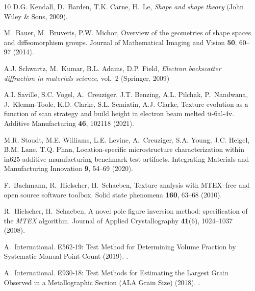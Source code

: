 \documentclass[pdflatex,iicol]{sn-jnl}%
\theoremstyle{thmstyleone}%
\theoremstyle{thmstyletwo}%
\theoremstyle{thmstylethree}%
\begin{document}
\begin{thebibliography}{10}
D.G. Kendall, D.~Barden, T.K. Carne, H.~Le, \emph{Shape and shape theory} (John Wiley \& Sons, 2009).
\newblock {}

M.~Bauer, M.~Bruveris, P.W. Michor, Overview of the geometries of shape spaces and diffeomorphism groups.
\newblock Journal of Mathematical Imaging and Vision \textbf{50}, 60--97 (2014).
\newblock {}

A.J. Schwartz, M.~Kumar, B.L. Adams, D.P. Field, \emph{Electron backscatter diffraction in materials science}, vol.~2 (Springer, 2009)

A.I. Saville, S.C. Vogel, A.~Creuziger, J.T. Benzing, A.L. Pilchak, P.~Nandwana, J.~Klemm-Toole, K.D. Clarke, S.L. Semiatin, A.J. Clarke, Texture evolution as a function of scan strategy and build height in electron beam melted ti-6al-4v.
\newblock Additive Manufacturing \textbf{46}, 102118 (2021).
\newblock {}

M.R. Stoudt, M.E. Williams, L.E. Levine, A.~Creuziger, S.A. Young, J.C. Heigel, B.M. Lane, T.Q. Phan, Location-specific microstructure characterization within in625 additive manufacturing benchmark test artifacts.
\newblock Integrating Materials and Manufacturing Innovation \textbf{9}, 54--69 (2020).
\newblock {}

F.~Bachmann, R.~Hielscher, H.~Schaeben, Texture analysis with {MTEX}--free and open source software toolbox.
\newblock Solid state phenomena \textbf{160}, 63--68 (2010).
\newblock {}

R.~Hielscher, H.~Schaeben, {A novel pole figure inversion method: specification of the {\it MTEX} algorithm}.
\newblock Journal of Applied Crystallography \textbf{41}(6), 1024--1037 (2008).
\newblock {}

A.~International.
 {E562}-19: {Test} {Method} for {Determining} {Volume} {Fraction} by {Systematic} {Manual} {Point} {Count} (2019).
\newblock {}.

A.~International.
 {E930}-18: {Test} {Methods} for {Estimating} the {Largest} {Grain} {Observed} in a {Metallographic} {Section} ({ALA} {Grain} {Size}) (2018).
\newblock {}.


\end{thebibliography}
\end{document}
